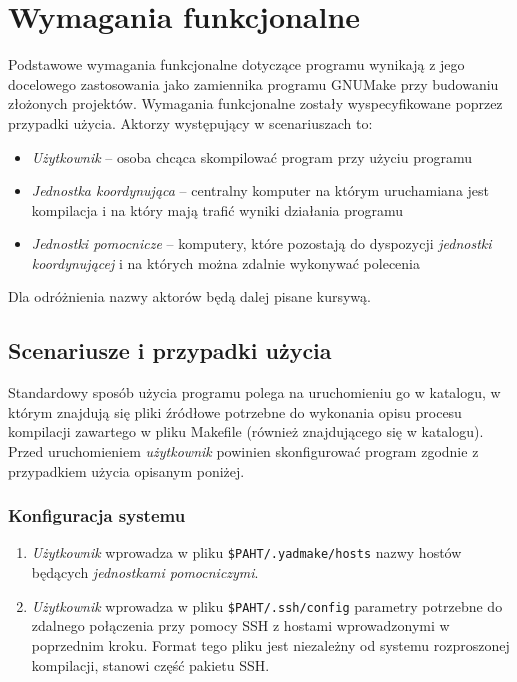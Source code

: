 \documentclass[a4paper]{article}
\begin{document}
\section{Wymagania funkcjonalne}

Podstawowe wymagania funkcjonalne dotyczące programu wynikają z jego docelowego zastosowania jako zamiennika programu GNUMake przy budowaniu złożonych projektów. Wymagania funkcjonalne zostały wyspecyfikowane poprzez przypadki użycia. Aktorzy występujący w scenariuszach to:
\begin{itemize}
	\item \emph{Użytkownik} -- osoba chcąca skompilować program przy użyciu programu
	\item \emph{Jednostka koordynująca} -- centralny komputer na którym uruchamiana jest kompilacja i na który mają trafić wyniki działania programu
	\item \emph{Jednostki pomocnicze} -- komputery, które pozostają do dyspozycji \emph{jednostki koordynującej} i na których można zdalnie wykonywać polecenia
\end{itemize}

Dla odróżnienia nazwy aktorów będą dalej pisane kursywą.

\subsection{Scenariusze i przypadki użycia}

Standardowy sposób użycia programu polega na uruchomieniu go w katalogu, w którym znajdują się pliki źródłowe potrzebne do wykonania opisu procesu kompilacji zawartego w pliku Makefile (również znajdującego się w katalogu). Przed uruchomieniem \emph{użytkownik} powinien skonfigurować program zgodnie z przypadkiem użycia opisanym poniżej.

\subsubsection{Konfiguracja systemu}

\begin{enumerate}
	\item \emph{Użytkownik} wprowadza w pliku \verb+$PAHT/.yadmake/hosts+ nazwy hostów będących \emph{jednostkami pomocniczymi}.
	\item \emph{Użytkownik} wprowadza w pliku \verb+$PAHT/.ssh/config+ parametry potrzebne do zdalnego połączenia przy pomocy SSH z hostami wprowadzonymi w poprzednim kroku. Format tego pliku jest niezależny od systemu rozproszonej kompilacji, stanowi część pakietu SSH.
\end{enumerate}
\end{document}
